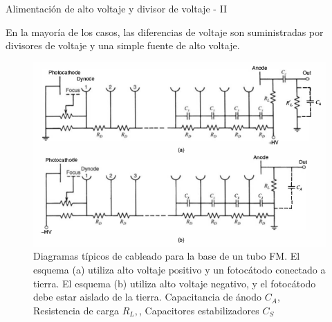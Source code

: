 \documentclass[a4paper,10pt]{beamer}
\begin{document}
\begin{frame}{Alimentación de alto voltaje y divisor de voltaje - II}
 
 En la mayoría de los casos, las diferencias de voltaje son suministradas por divisores 
 de voltaje y una simple fuente de alto voltaje.
 
 \begin{figure}
  \center
  \includegraphics[scale=0.4]{fig30}
  \caption{\footnotesize Diagramas típicos de cableado para la base de un tubo FM. El esquema (a)
  utiliza alto voltaje positivo y un fotocátodo conectado a tierra. El esquema (b)
  utiliza alto voltaje negativo, y el fotocátodo debe estar aislado de la tierra. 
  Capacitancia de ánodo $C_A$, Resistencia de carga $R_L,$, Capacitores estabilizadores 
  $C_S$}
 \end{figure}
\end{frame}
\end{document}
